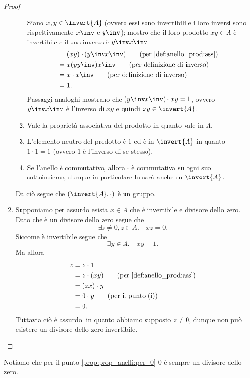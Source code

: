 \begin{proof}
\begin{enumerate}[label={(\roman*)}]
\begin{enumerate}[label={(G\arabic*)}]
            Siano $x,y \in \invert{A}$ (ovvero essi sono invertibili e i loro inversi sono rispettivamente $x\inv$ e $y\inv$); mostro che il loro prodotto $xy \in A$ è invertibile e il suo inverso è $y\inv x\inv$.
            \begin{align*}
                &(xy) \cdot (y\inv x\inv) \tag{per \ref{def:anello_prod:ass}} \\
                =\ &x (y y\inv) x\inv \tag{per definizione di inverso} \\
                =\ &x \cdot x\inv \tag{per definizione di inverso}\\
                =\ &1.
            \end{align*}
            Passaggi analoghi mostrano che $(y\inv x\inv) \cdot xy = 1$, ovvero $y\inv x\inv$ è l'inverso di $xy$ e quindi $xy \in \invert{A}$.
            \item Vale la proprietà associativa del prodotto in quanto vale in $A$.
            \item L'elemento neutro del prodotto è $1$ ed è in $\invert{A}$ in quanto $1 \cdot 1 = 1$ (ovvero $1$ è l'inverso di se stesso).
            \item Se l'anello è commutativo, allora $\cdot$ è commutativa su ogni suo sottoinsieme, dunque in particolare lo sarà anche su $\invert{A}$.
        \end{enumerate}
        Da ciò segue che $(\invert{A}, \cdot)$ è un gruppo.
        \item Supponiamo per assurdo esista $x \in A$ che è invertibile e divisore dello zero.
        Dato che è un divisore dello zero segue che \[
            \exists z \neq 0, z \in A. \quad xz = 0.    
        \] Siccome è invertibile segue che \[
            \exists y \in A. \quad xy = 1.    
        \] Ma allora \begin{align*}
            z &= z\cdot 1\\
            &= z \cdot (xy) \tag{per \ref{def:anello_prod:ass}}\\
            &= (zx) \cdot y \\
            &= 0 \cdot y \tag{per il punto (i)}\\
            &= 0.
        \end{align*} Tuttavia ciò è assurdo, in quanto abbiamo supposto $z \neq 0$, dunque non può esistere un divisore dello zero invertibile.
    \end{enumerate}
\end{proof}

\begin{remark}
    Notiamo che per il punto \ref{prop:prop_anelli:per_0} $0$ è sempre un divisore dello zero.
\end{remark}


